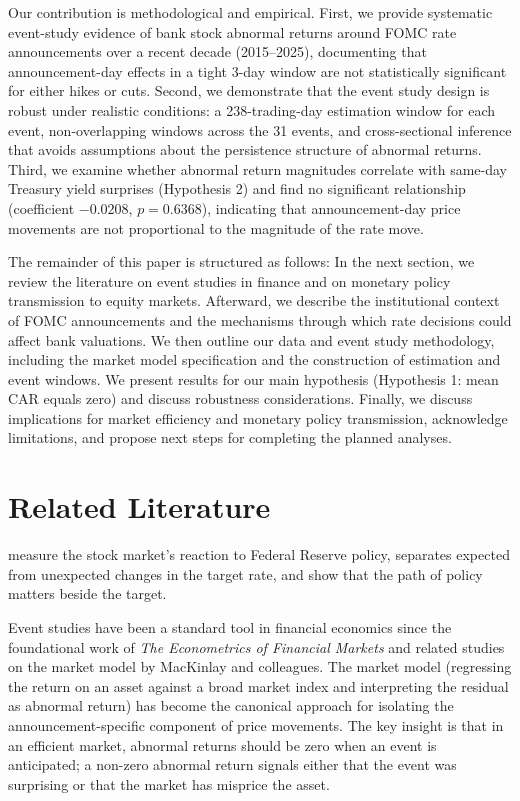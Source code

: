 \documentclass[11pt]{article}
\begin{document}
Our contribution is methodological and empirical. First, we provide systematic event-study evidence of bank stock abnormal returns around FOMC rate announcements over a recent decade (2015--2025), documenting that announcement-day effects in a tight 3-day window are not statistically significant for either hikes or cuts. Second, we demonstrate that the event study design is robust under realistic conditions: a 238-trading-day estimation window for each event, non-overlapping windows across the 31 events, and cross-sectional inference that avoids assumptions about the persistence structure of abnormal returns. Third, we examine whether abnormal return magnitudes correlate with same-day Treasury yield surprises (Hypothesis 2) and find no significant relationship (coefficient $-0.0208$, $p = 0.6368$), indicating that announcement-day price movements are not proportional to the magnitude of the rate move.

The remainder of this paper is structured as follows: In the next section, we review the literature on event studies in finance and on monetary policy transmission to equity markets. Afterward, we describe the institutional context of FOMC announcements and the mechanisms through which rate decisions could affect bank valuations. We then outline our data and event study methodology, including the market model specification and the construction of estimation and event windows. We present results for our main hypothesis (Hypothesis 1: mean CAR equals zero) and discuss robustness considerations. Finally, we discuss implications for market efficiency and monetary policy transmission, acknowledge limitations, and propose next steps for completing the planned analyses.

\section{Related Literature}

\citet{Bernanke:2005} measure the stock market's reaction to Federal Reserve policy, \citet{kuttner2001monetary} separates expected from unexpected changes in the target rate, and \citet{gurkaynak2005do} show that the path of policy matters beside the target.

Event studies have been a standard tool in financial economics since the foundational work of \textit{The Econometrics of Financial Markets} and related studies on the market model by MacKinlay and colleagues. The market model (regressing the return on an asset against a broad market index and interpreting the residual as abnormal return) has become the canonical approach for isolating the announcement-specific component of price movements. The key insight is that in an efficient market, abnormal returns should be zero when an event is anticipated; a non-zero abnormal return signals either that the event was surprising or that the market has misprice the asset.
\end{document}
